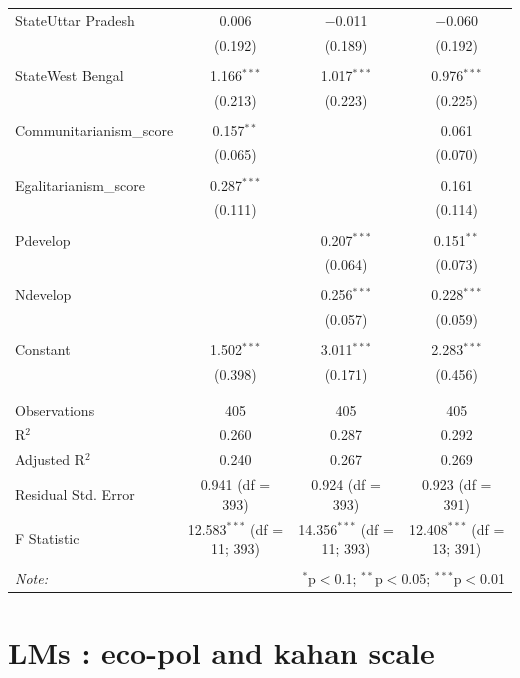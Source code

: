 \documentclass[
]{article}
\begin{document}
\begin{table}[!htbp]
\begin{tabular}{@{\extracolsep{5pt}}lccc}
 StateUttar Pradesh & 0.006 & $-$0.011 & $-$0.060 \\ 
  & (0.192) & (0.189) & (0.192) \\ 
  & & & \\ 
 StateWest Bengal & 1.166$^{***}$ & 1.017$^{***}$ & 0.976$^{***}$ \\ 
  & (0.213) & (0.223) & (0.225) \\ 
  & & & \\ 
 Communitarianism\_score & 0.157$^{**}$ &  & 0.061 \\ 
  & (0.065) &  & (0.070) \\ 
  & & & \\ 
 Egalitarianism\_score & 0.287$^{***}$ &  & 0.161 \\ 
  & (0.111) &  & (0.114) \\ 
  & & & \\ 
 Pdevelop &  & 0.207$^{***}$ & 0.151$^{**}$ \\ 
  &  & (0.064) & (0.073) \\ 
  & & & \\ 
 Ndevelop &  & 0.256$^{***}$ & 0.228$^{***}$ \\ 
  &  & (0.057) & (0.059) \\ 
  & & & \\ 
 Constant & 1.502$^{***}$ & 3.011$^{***}$ & 2.283$^{***}$ \\ 
  & (0.398) & (0.171) & (0.456) \\ 
  & & & \\ 
\hline \\[-1.8ex] 
Observations & 405 & 405 & 405 \\ 
R$^{2}$ & 0.260 & 0.287 & 0.292 \\ 
Adjusted R$^{2}$ & 0.240 & 0.267 & 0.269 \\ 
Residual Std. Error & 0.941 (df = 393) & 0.924 (df = 393) & 0.923 (df = 391) \\ 
F Statistic & 12.583$^{***}$ (df = 11; 393) & 14.356$^{***}$ (df = 11; 393) & 12.408$^{***}$ (df = 13; 391) \\ 
\hline 
\hline \\[-1.8ex] 
\textit{Note:}  & \multicolumn{3}{r}{$^{*}$p$<$0.1; $^{**}$p$<$0.05; $^{***}$p$<$0.01} \\ 
\end{tabular} 
\end{table} 
\endgroup

\newpage

\hypertarget{lms-eco-pol-and-kahan-scale}{%
\section{LMs : eco-pol and kahan
scale}\label{lms-eco-pol-and-kahan-scale}}
\end{document}
